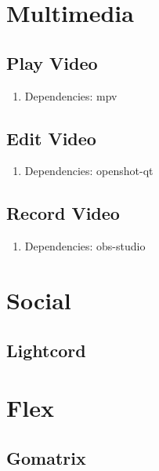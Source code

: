 \documentclass[10pt, a4paper, onecolumn, openany]{book} %
\begin{document}
\section{Multimedia}
\subsection{Play Video}
\begin{enumerate}
    \item Dependencies: mpv
\end{enumerate}
\subsection{Edit Video}
\begin{enumerate}
    \item Dependencies: openshot-qt
\end{enumerate}
\subsection{Record Video}
\begin{enumerate}
    \item Dependencies: obs-studio
\end{enumerate}
\section{Social}
\subsection{Lightcord}
\section{Flex}
\subsection{Gomatrix}
\end{document}
